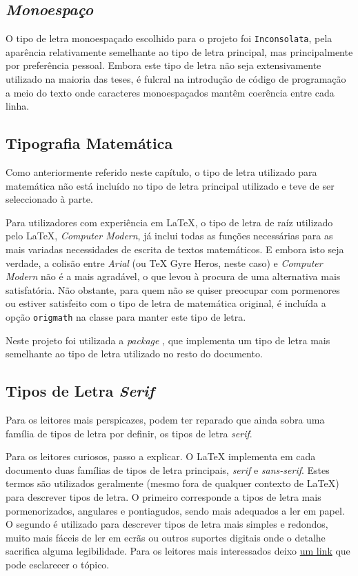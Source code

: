 \documentclass{../ist-thesis}
\begin{document}
\subsection{\textit{Monoespaço}}

O tipo de letra monoespaçado escolhido para o projeto foi \texttt{Inconsolata}, pela aparência relativamente semelhante ao tipo de letra principal, mas principalmente por preferência pessoal. Embora este tipo de letra não seja extensivamente utilizado na maioria das teses, é fulcral na introdução de código de programação a meio do texto onde caracteres monoespaçados mantêm coerência entre cada linha.

\subsection{Tipografia Matemática}
\label{sec:mathfont}

Como anteriormente referido neste capítulo, o tipo de letra utilizado para matemática não está incluído no tipo de letra principal utilizado e teve de ser seleccionado à parte.

Para utilizadores com experiência em \LaTeX{}, o tipo de letra de raíz utilizado pelo \LaTeX{}, \textit{Computer Modern}, já inclui todas as funções necessárias para as mais variadas necessidades de escrita de textos matemáticos. E embora isto seja verdade, a colisão entre \textit{Arial} (ou \TeX{} Gyre Heros, neste caso) e \textit{Computer Modern} não é a mais agradável, o que levou à procura de uma alternativa mais satisfatória. Não obstante, para quem não se quiser preocupar com pormenores ou estiver satisfeito com o tipo de letra de matemática original, é incluída a opção \texttt{origmath} na classe para manter este tipo de letra.

Neste projeto foi utilizada a \textit{package} , que implementa um tipo de letra mais semelhante ao tipo de letra utilizado no resto do documento.

\subsection{Tipos de Letra \textit{Serif}}

Para os leitores mais perspicazes, podem ter reparado que ainda sobra uma família de tipos de letra por definir, os tipos de letra \textit{serif}.

Para os leitores curiosos, passo a explicar. O \LaTeX{} implementa em cada documento duas famílias de tipos de letra principais, \textit{serif} e \textit{sans-serif}. Estes termos são utilizados geralmente (mesmo fora de qualquer contexto de \LaTeX{}) para descrever tipos de letra. O primeiro corresponde a tipos de letra mais pormenorizados, angulares e pontiagudos, sendo mais adequados a ler em papel. O segundo é utilizado para descrever tipos de letra mais simples e redondos, muito mais fáceis de ler em ecrãs ou outros suportes digitais onde o detalhe sacrifica alguma legibilidade. Para os leitores mais interessados deixo \href{https://en.wikipedia.org/wiki/Serif}{um link} que pode esclarecer o tópico.
\end{document}
